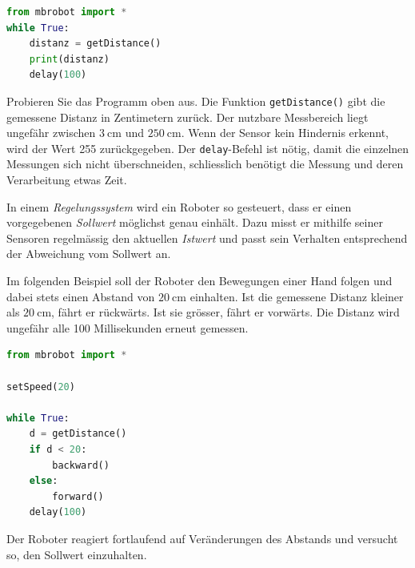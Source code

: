 \begin{lstlisting}[language=Python]
from mbrobot import *
while True:
    distanz = getDistance()
    print(distanz)
    delay(100)
\end{lstlisting}

Probieren Sie das Programm oben aus.
Die Funktion \texttt{getDistance()} gibt die gemessene
Distanz in Zentimetern zurück. Der nutzbare Messbereich
liegt ungefähr zwischen \(\SI{3}{\centi\meter}\) und
\(\SI{250}{\centi\meter}\). Wenn der Sensor kein Hindernis erkennt, wird der Wert 255 zurückgegeben. Der \texttt{delay}-Befehl ist nötig, damit die einzelnen Messungen sich nicht überschneiden, schliesslich benötigt die Messung und deren Verarbeitung etwas Zeit.



\begin{myexample}


    In einem \emph{Regelungssystem} wird ein Roboter so gesteuert,
    dass er einen vorgegebenen \emph{Sollwert} möglichst genau
    einhält. Dazu misst er mithilfe seiner Sensoren regelmässig
    den aktuellen \emph{Istwert} und passt sein Verhalten
    entsprechend der Abweichung vom Sollwert an.

    Im folgenden Beispiel soll der Roboter den Bewegungen
    einer Hand folgen und dabei stets einen Abstand von
    \(\SI{20}{\centi\meter}\) einhalten. Ist die gemessene
    Distanz kleiner als \(\SI{20}{\centi\meter}\), fährt er
    rückwärts. Ist sie grösser, fährt er vorwärts.
    Die Distanz wird ungefähr alle 100 Millisekunden
    erneut gemessen.

    \begin{lstlisting}[language=Python]
from mbrobot import *

setSpeed(20)

while True:
    d = getDistance()
    if d < 20:
        backward()
    else:
        forward()
    delay(100)
    \end{lstlisting}

    Der Roboter reagiert fortlaufend auf Veränderungen
    des Abstands und versucht so, den Sollwert einzuhalten.
\end{myexample}


